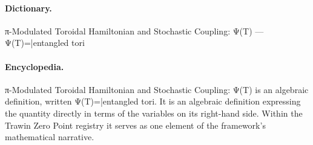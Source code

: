 \paragraph{Dictionary.}
π-Modulated Toroidal Hamiltonian and Stochastic Coupling: Ψ(T) — Ψ(T)=|entangled tori

\paragraph{Encyclopedia.}
π-Modulated Toroidal Hamiltonian and Stochastic Coupling: Ψ(T) is an algebraic definition, written Ψ(T)=|entangled tori. It is an algebraic definition expressing the quantity directly in terms of the variables on its right-hand side. Within the Trawin Zero Point registry it serves as one element of the framework's mathematical narrative.
